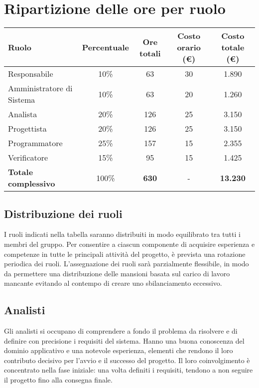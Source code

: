 \documentclass[a4paper, 11pt, oneside]{scrartcl} %
\begin{document}
\section{Ripartizione delle ore per ruolo}

\begin{center}
\begin{tabular}{|l|c|c|c|c|}
\hline
\textbf{Ruolo} & \textbf{Percentuale} & \textbf{Ore totali} & \textbf{Costo orario (€)} & \textbf{Costo totale (€)} \\
\hline
Responsabile & 10\% & 63 & 30 & 1.890 \\
Amministratore di Sistema & 10\% & 63 & 20 & 1.260 \\
Analista & 20\% & 126 & 25 & 3.150 \\
Progettista & 20\% & 126 & 25 & 3.150 \\
Programmatore & 25\% & 157 & 15 & 2.355 \\
Verificatore & 15\% & 95 & 15 & 1.425 \\
\hline
\textbf{Totale complessivo} & 100\% & \textbf{630} & - & \textbf{13.230} \\
\hline
\end{tabular}
\end{center}

\subsection{Distribuzione dei ruoli}

I ruoli indicati nella tabella saranno distribuiti in modo equilibrato tra tutti i membri del gruppo.  
Per consentire a ciascun componente di acquisire esperienza e competenze in tutte le principali attività del progetto, è prevista una rotazione periodica dei ruoli. L'assegnazione dei ruoli sarà parzialmente flessibile, in modo da permettere una distribuzione delle mansioni basata sul carico di lavoro mancante evitando al contempo di creare uno sbilanciamento eccessivo. 

\subsection{Analisti}

Gli analisti si occupano di comprendere a fondo il problema da risolvere e di definire con precisione i requisiti del sistema.  
Hanno una buona conoscenza del dominio applicativo e una notevole esperienza, elementi che rendono il loro contributo decisivo per l’avvio e il successo del progetto.  
Il loro coinvolgimento è concentrato nella fase iniziale: una volta definiti i requisiti, tendono a non seguire il progetto fino alla consegna finale.
\end{document}
